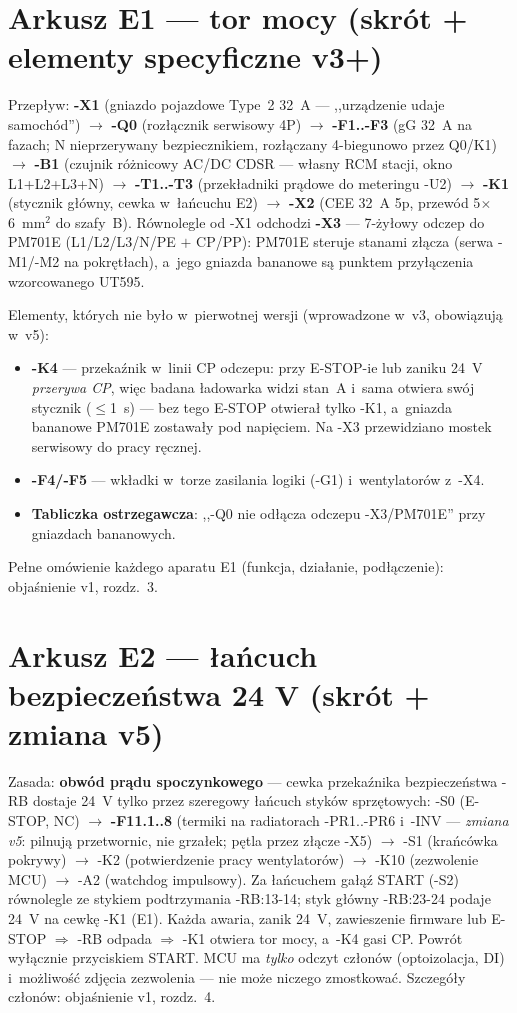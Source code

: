 \documentclass[11pt,a4paper]{article}
\begin{document}
\section{Arkusz E1 --- tor mocy (skrót + elementy specyficzne v3+)}
Przepływ: \textbf{-X1} (gniazdo pojazdowe Type~2 32~A --- ,,urządzenie udaje samochód'') $\to$ \textbf{-Q0}
(rozłącznik serwisowy 4P) $\to$ \textbf{-F1..-F3} (gG 32~A na fazach; N nieprzerywany bezpiecznikiem, rozłączany
4-biegunowo przez Q0/K1) $\to$ \textbf{-B1} (czujnik różnicowy AC/DC CDSR --- własny RCM stacji, okno
L1+L2+L3+N) $\to$ \textbf{-T1..-T3} (przekładniki prądowe do meteringu -U2) $\to$ \textbf{-K1} (stycznik główny,
cewka w~łańcuchu E2) $\to$ \textbf{-X2} (CEE 32~A 5p, przewód 5$\times$6~mm$^2$ do szafy~B). Równolegle od -X1
odchodzi \textbf{-X3} --- 7-żyłowy odczep do PM701E (L1/L2/L3/N/PE $+$ CP/PP): PM701E steruje stanami złącza
(serwa -M1/-M2 na pokrętłach), a~jego gniazda bananowe są punktem przyłączenia wzorcowanego UT595.

Elementy, których nie było w~pierwotnej wersji (wprowadzone w~v3, obowiązują w~v5):
\begin{itemize}
\item \textbf{-K4} --- przekaźnik w~linii CP odczepu: przy E-STOP-ie lub zaniku 24~V \emph{przerywa CP}, więc
badana ładowarka widzi stan~A i~sama otwiera swój stycznik ($\le$1~s) --- bez tego E-STOP otwierał tylko -K1,
a~gniazda bananowe PM701E zostawały pod napięciem. Na -X3 przewidziano mostek serwisowy do pracy ręcznej.
\item \textbf{-F4/-F5} --- wkładki w~torze zasilania logiki (-G1) i~wentylatorów z~-X4.
\item \textbf{Tabliczka ostrzegawcza}: ,,-Q0 nie odłącza odczepu -X3/PM701E'' przy gniazdach bananowych.
\end{itemize}
Pełne omówienie każdego aparatu E1 (funkcja, działanie, podłączenie): objaśnienie v1, rozdz.~3.

\section{Arkusz E2 --- łańcuch bezpieczeństwa 24 V (skrót + zmiana v5)}
Zasada: \textbf{obwód prądu spoczynkowego} --- cewka przekaźnika bezpieczeństwa -RB dostaje 24~V tylko przez
szeregowy łańcuch styków sprzętowych: -S0 (E-STOP, NC) $\to$ \textbf{-F11.1..8} (termiki na radiatorach
-PR1..-PR6 i~-INV --- \emph{zmiana v5}: pilnują przetwornic, nie grzałek; pętla przez złącze -X5)
$\to$ -S1 (krańcówka pokrywy) $\to$ -K2 (potwierdzenie pracy wentylatorów) $\to$ -K10 (zezwolenie MCU)
$\to$ -A2 (watchdog impulsowy). Za łańcuchem gałąź START (-S2) równolegle ze stykiem podtrzymania -RB:13-14;
styk główny -RB:23-24 podaje 24~V na cewkę -K1 (E1). Każda awaria, zanik 24~V, zawieszenie firmware lub E-STOP
$\Rightarrow$ -RB odpada $\Rightarrow$ -K1 otwiera tor mocy, a~-K4 gasi CP. Powrót wyłącznie przyciskiem START.
MCU ma \emph{tylko} odczyt członów (optoizolacja, DI) i~możliwość zdjęcia zezwolenia --- nie może niczego
zmostkować. Szczegóły członów: objaśnienie v1, rozdz.~4.
\end{document}
